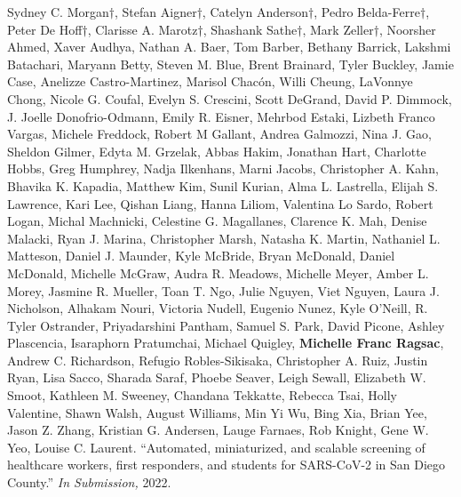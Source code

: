 \documentclass[11pt]{formatting-template}
\begin{document}
\begin{vita}
\noindent Sydney C. Morgan$\dagger$, Stefan Aigner$\dagger$, Catelyn Anderson$\dagger$, Pedro Belda-Ferre$\dagger$, Peter De Hoff$\dagger$, Clarisse A. Marotz$\dagger$, Shashank Sathe$\dagger$, Mark Zeller$\dagger$, Noorsher Ahmed, Xaver Audhya, Nathan A. Baer, Tom Barber, Bethany Barrick, Lakshmi Batachari, Maryann Betty, Steven M. Blue, Brent Brainard, Tyler Buckley, Jamie Case, Anelizze Castro-Martinez, Marisol Chacón, Willi Cheung, LaVonnye Chong, Nicole G. Coufal, Evelyn S. Crescini, Scott DeGrand, David P. Dimmock, J. Joelle Donofrio-Odmann, Emily R. Eisner, Mehrbod Estaki, Lizbeth Franco Vargas, Michele Freddock, Robert M Gallant, Andrea Galmozzi, Nina J. Gao, Sheldon Gilmer, Edyta M. Grzelak, Abbas Hakim, Jonathan Hart, Charlotte Hobbs, Greg Humphrey, Nadja Ilkenhans, Marni Jacobs, Christopher A. Kahn, Bhavika K. Kapadia, Matthew Kim, Sunil Kurian, Alma L. Lastrella, Elijah S. Lawrence, Kari Lee, Qishan Liang, Hanna Liliom, Valentina Lo Sardo, Robert Logan, Michal Machnicki, Celestine G. Magallanes, Clarence K. Mah, Denise Malacki, Ryan J. Marina, Christopher Marsh, Natasha K. Martin, Nathaniel L. Matteson, Daniel J. Maunder, Kyle McBride, Bryan McDonald, Daniel McDonald, Michelle McGraw, Audra R. Meadows, Michelle Meyer, Amber L. Morey, Jasmine R. Mueller, Toan T. Ngo, Julie Nguyen, Viet Nguyen, Laura J. Nicholson, Alhakam Nouri, Victoria Nudell, Eugenio Nunez, Kyle O’Neill, R. Tyler Ostrander, Priyadarshini Pantham, Samuel S. Park, David Picone, Ashley Plascencia, Isaraphorn Pratumchai, Michael Quigley, \textbf{Michelle Franc Ragsac}, Andrew C. Richardson, Refugio Robles-Sikisaka, Christopher A. Ruiz, Justin Ryan, Lisa Sacco, Sharada Saraf, Phoebe Seaver, Leigh Sewall, Elizabeth W. Smoot, Kathleen M. Sweeney, Chandana Tekkatte, Rebecca Tsai, Holly Valentine, Shawn Walsh, August Williams, Min Yi Wu, Bing Xia, Brian Yee, Jason Z. Zhang, Kristian G. Andersen, Lauge Farnaes, Rob Knight, Gene W. Yeo, Louise C. Laurent. ``Automated, miniaturized, and scalable screening of healthcare workers, first responders, and students for SARS-CoV-2 in San Diego County.'' \textit{In Submission,} 2022.


\end{vita}
\end{document}
